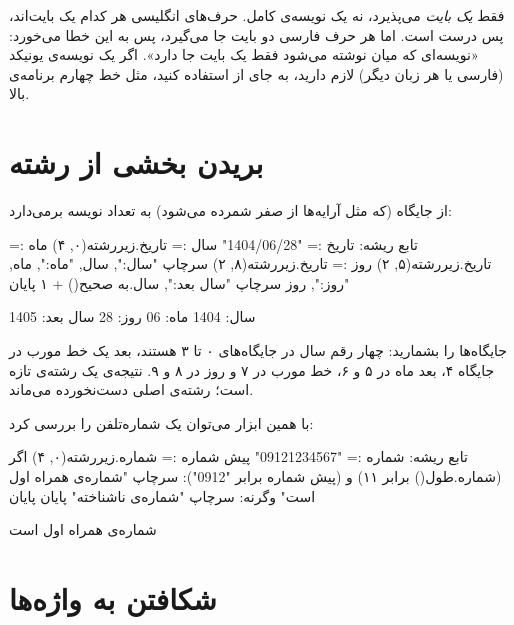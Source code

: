 \begin{warn}
 فقط \emph{یک بایت} می‌پذیرد، نه یک نویسه‌ی کامل. حرف‌های
انگلیسی هر کدام یک بایت‌اند، پس  درست است. اما هر حرف فارسی دو
بایت جا می‌گیرد، پس  به این خطا می‌خورد: «نویسه‌ای که میان
 نوشته می‌شود فقط یک بایت جا دارد». اگر
یک نویسه‌ی یونیکد (فارسی یا هر زبان دیگر) لازم دارید، به جای  از
 استفاده کنید، مثل خط چهارم برنامه‌ی بالا.
\end{warn}

\section{بریدن بخشی از رشته}

 از جایگاه  (که مثل آرایه‌ها از صفر
شمرده می‌شود) به تعداد  نویسه برمی‌دارد:

\begin{salamfa}
تابع ریشه:
    تاریخ := "1404/06/28"
    سال := تاریخ.زیررشته(۰, ۴)
    ماه := تاریخ.زیررشته(۵, ۲)
    روز := تاریخ.زیررشته(۸, ۲)
    سرچاپ "سال:", سال, "ماه:", ماه, "روز:", روز
    سرچاپ "سال بعد:", سال.به صحیح() + ۱
پایان
\end{salamfa}

\begin{outputfa}
سال: 1404 ماه: 06 روز: 28
سال بعد: 1405
\end{outputfa}

جایگاه‌ها را بشمارید: چهار رقم سال در جایگاه‌های ۰ تا ۳ هستند، بعد یک
خط مورب در جایگاه ۴، بعد ماه در ۵ و ۶، خط مورب در ۷ و روز در ۸ و ۹.
نتیجه‌ی  یک رشته‌ی تازه است؛ رشته‌ی اصلی دست‌نخورده می‌ماند.

با همین ابزار می‌توان یک شماره‌تلفن را بررسی کرد:

\begin{salamfa}
تابع ریشه:
    شماره := "09121234567"
    پیش شماره := شماره.زیررشته(۰, ۴)
    اگر (شماره.طول() برابر ۱۱) و (پیش شماره برابر "0912"):
        سرچاپ "شماره‌ی همراه اول است"
    وگرنه:
        سرچاپ "شماره‌ی ناشناخته"
    پایان
پایان
\end{salamfa}

\begin{outputfa}
شماره‌ی همراه اول است
\end{outputfa}

\section{شکافتن به واژه‌ها}


